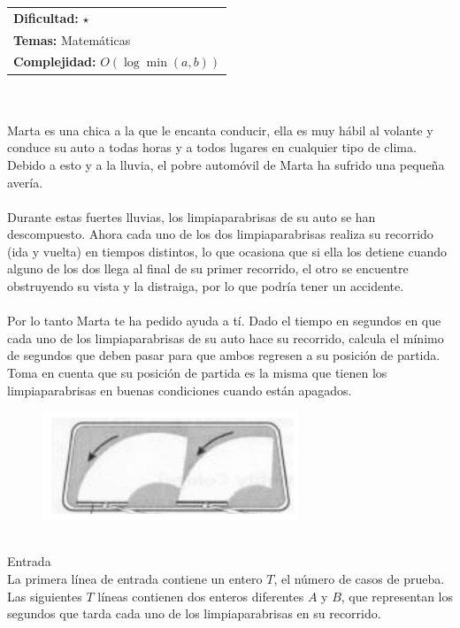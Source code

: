 \documentclass[12pt]{article}
\begin{document}
\hfill
\begin{tabular}{@{}l@{}}
\textbf{Dificultad:} $\star$ \\
\textbf{Temas:} Matemáticas \\
\textbf{Complejidad:} $O(\log \min(a, b))$
\end{tabular}\\
\\Marta es una chica a la que le encanta conducir, ella es muy hábil al volante y conduce su auto a todas horas y a todos lugares en cualquier tipo de clima. Debido a esto y a la lluvia, el pobre automóvil de Marta ha sufrido una pequeña avería.\\
\\Durante estas fuertes lluvias, los limpiaparabrisas de su auto se han descompuesto. Ahora cada uno de los dos limpiaparabrisas realiza su recorrido (ida y vuelta) en tiempos distintos, lo que ocasiona que si ella los detiene cuando alguno de los dos llega al final de su primer recorrido, el otro se encuentre obstruyendo su vista y la distraiga, por lo que podría tener un accidente.\\
\\Por lo tanto Marta te ha pedido ayuda a tí. Dado el tiempo en segundos en que cada uno de los limpiaparabrisas de su auto hace su recorrido, calcula el mínimo de segundos que deben pasar para que ambos regresen a su posición de partida. Toma en cuenta que su posición de partida es la misma que tienen los limpiaparabrisas en buenas condiciones cuando están apagados.\\
\begin{figure}[h!] 
\begin{center} 
\includegraphics[scale = 0.90]{pa.PNG}\hspace{50mm}  
\end{center} 
\end{figure}
\\Entrada
\\La primera línea de entrada contiene un entero $T$, el número de casos de prueba. Las siguientes $T$ líneas contienen dos enteros diferentes $A$ y $B$, que representan los segundos que tarda cada uno de los limpiaparabrisas en su recorrido.
\end{document}
